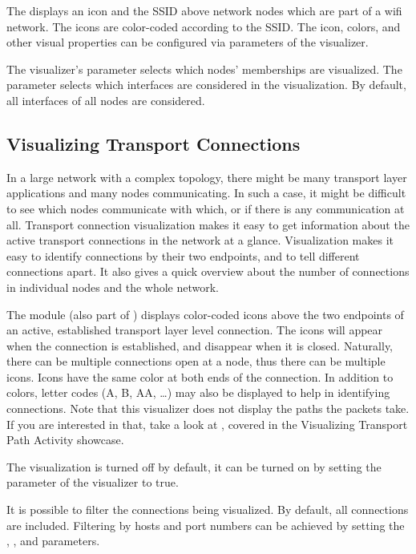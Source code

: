 The  displays an icon and the SSID above network nodes which
are part of a wifi network. The icons are color-coded according to the SSID. The
icon, colors, and other visual properties can be configured via parameters of
the visualizer.

The visualizer's  parameter selects which nodes' memberships are
visualized. The  parameter selects which interfaces are
considered in the visualization. By default, all interfaces of all nodes are
considered.


\subsection{Visualizing Transport Connections}
\label{sec:visualization:transport-connections}

In a large network with a complex topology, there might be many transport layer
applications and many nodes communicating. In such a case, it might be difficult
to see which nodes communicate with which, or if there is any communication at
all. Transport connection visualization makes it easy to get information about
the active transport connections in the network at a glance. Visualization makes
it easy to identify connections by their two endpoints, and to tell different
connections apart. It also gives a quick overview about the number of
connections in individual nodes and the whole network.

The  module (also part of )
displays color-coded icons above the two endpoints of an active, established
transport layer level connection. The icons will appear when the connection is
established, and disappear when it is closed. Naturally, there can be multiple
connections open at a node, thus there can be multiple icons. Icons have the
same color at both ends of the connection. In addition to colors, letter codes
(A, B, AA, …) may also be displayed to help in identifying connections. Note
that this visualizer does not display the paths the packets take. If you are
interested in that, take a look at , covered in the
Visualizing Transport Path Activity showcase.

The visualization is turned off by default, it can be turned on by setting the
 parameter of the visualizer to true.

It is possible to filter the connections being visualized. By default, all
connections are included. Filtering by hosts and port numbers can be achieved by
setting the , ,
 and  parameters.

